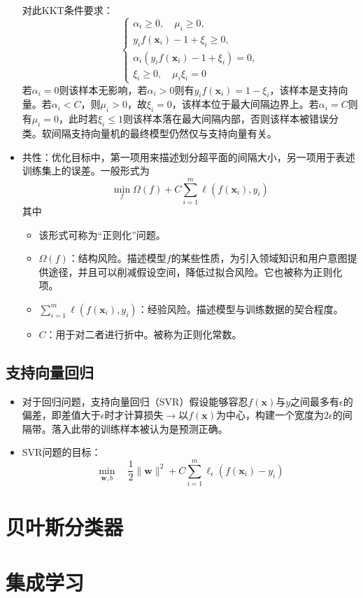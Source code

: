 \documentclass{ctexart}
\begin{document}
\begin{itemize}
						对此KKT条件要求：\[\left\{\begin{aligned}
						\alpha_i\ge0, \quad \mu_i\ge0,\\
						y_if(\bm{x}_i)-1+\xi_i\ge0,\\
						\alpha_i(y_if(\bm{x}_i)-1+\xi_i)=0,\\
						\xi_i\ge0,\quad \mu_i\xi_i=0
						\end{aligned}\right.\]若$\alpha_i=0$则该样本无影响，若$\alpha_i>0$则有$y_if(\bm{x}_i)=1-\xi_i$，该样本是支持向量。若$\alpha_i<C$，则$\mu_i>0$，故$\xi_i=0$，该样本位于最大间隔边界上。若$\alpha_i=C$则有$\mu_i=0$，此时若$\xi_i\le1$则该样本落在最大间隔内部，否则该样本被错误分类。软间隔支持向量机的最终模型仍然仅与支持向量有关。
						\item 共性：优化目标中，第一项用来描述划分超平面的间隔大小，另一项用于表述训练集上的误差。一般形式为\[\min\limits_{f}\Omega(f)+C\sum_{i=1}^{m}\ell(f(\bm{x}_i),y_i)\]其中\begin{itemize}
							\item 该形式可称为``正则化''问题。
							\item $\Omega(f)$：结构风险。描述模型$f$的某些性质，为引入领域知识和用户意图提供途径，并且可以削减假设空间，降低过拟合风险。它也被称为正则化项。
							\item $\sum_{i=1}^{m}\ell(f(\bm{x}_i),y_i)$：经验风险。描述模型与训练数据的契合程度。
							\item $C$：用于对二者进行折中。被称为正则化常数。
						\end{itemize}
					\end{itemize}
				\subsection{支持向量回归}
					\begin{itemize}
						\item 对于回归问题，支持向量回归（SVR）假设能够容忍$f(\bm{x})$与$y$之间最多有$\epsilon$的偏差，即差值大于$\epsilon$时才计算损失$\rightarrow$以$f(\bm{x})$为中心，构建一个宽度为$2\epsilon$的间隔带。落入此带的训练样本被认为是预测正确。
						\item SVR问题的目标：\[\min\limits_{\bm{w},b}\quad\frac{1}{2}\parallel\bm{w}\parallel^2+C\sum_{i=1}^{m}\ell_\epsilon(f(\bm{x}_i)-y_i)\]
					\end{itemize}
			\section{贝叶斯分类器}
			\section{集成学习}
\end{document}
